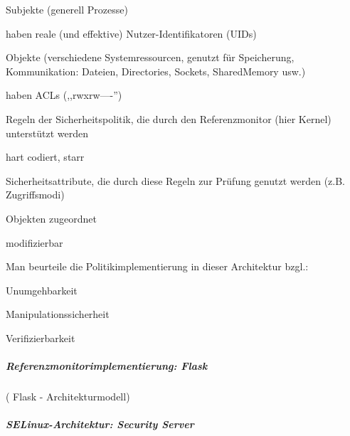 \documentclass[a4paper]{article}
\begin{document}
\begin{multicols}{3}
    \begin{itemize*}
        \item
        Subjekte (generell Prozesse)
        \begin{itemize*}
            \item haben reale (und effektive) Nutzer-Identifikatoren (UIDs)
        \end{itemize*}
        \item
        Objekte (verschiedene Systemressourcen, genutzt für Speicherung,
        Kommunikation: Dateien, Directories, Sockets, SharedMemory usw.)
        \begin{itemize*}
            \item haben ACLs (,,rwxrw----'')
        \end{itemize*}
        \item
        Regeln der Sicherheitspolitik, die durch den Referenzmonitor (hier
        Kernel) unterstützt werden
        \begin{itemize*}
            \item hart codiert, starr
        \end{itemize*}
        \item
        Sicherheitsattribute, die durch diese Regeln zur Prüfung genutzt
        werden (z.B. Zugriffsmodi)
        \begin{itemize*}
            \item Objekten zugeordnet
            \item modifizierbar
        \end{itemize*}
    \end{itemize*}

    Man beurteile die Politikimplementierung in dieser Architektur bzgl.:

    \begin{itemize*}
        \item
        Unumgehbarkeit
        \item
        Manipulationssicherheit
        \item
        Verifizierbarkeit
    \end{itemize*}


    \subparagraph{Referenzmonitorimplementierung:
        Flask}

    ( Flask - Architekturmodell)



    \subparagraph{SELinux-Architektur: Security
        Server}


\end{multicols}
\end{document}
